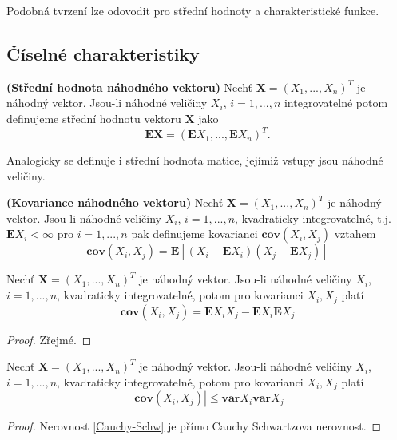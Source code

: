 \begin{remark}
Podobná tvrzení lze odovodit pro střední hodnoty a charakteristické funkce.
\end{remark}

\subsection{Číselné charakteristiky}
\begin{definition}{\textbf{(Střední hodnota náhodného vektoru)}}
Nechť $\textbf{X} = (X_{1}, ..., X_{n})^{T}$ je náhodný vektor. Jsou-li náhodné veličiny $X_{i}$, $i = 1, ..., n$ integrovatelné potom definujeme střední hodnotu vektoru $\textbf{X}$ jako
\begin{equation}
\mathbf{E}\textbf{X} = (\mathbf{E}X_{1}, ..., \mathbf{E}X_{n})^{T}.
\end{equation}
\end{definition}

Analogicky se definuje i střední hodnota matice, jejímiž vstupy jsou náhodné veličiny.

\begin{definition}{\textbf{(Kovariance náhodného vektoru)}}
Nechť $\textbf{X} = (X_{1}, ..., X_{n})^{T}$ je náhodný vektor. Jsou-li náhodné veličiny $X_{i}$, $i = 1, ..., n$, kvadraticky integrovatelné, t.j. $\mathbf{E}X_{i} < \infty$ pro $i = 1, ..., n$ pak definujeme kovarianci $\mathbf{cov}(X_{i}, X_{j})$ vztahem
\begin{equation}
\mathbf{cov}(X_{i}, X_{j}) = \mathbf{E}[(X_{i} - \mathbf{E}X_{i})(X_{j} - \mathbf{E}X_{j})] 
\end{equation}
\end{definition}

\begin{proposition}
Nechť $\textbf{X} = (X_{1}, ..., X_{n})^{T}$ je náhodný vektor. Jsou-li náhodné veličiny $X_{i}$, $i = 1, ..., n$, kvadraticky integrovatelné, potom pro kovarianci $X_{i}, X_{j}$ platí
\begin{equation}
\mathbf{cov}(X_{i}, X_{j}) = \mathbf{E}X_{i}X_{j} - \mathbf{E}X_{i}\mathbf{E}X_{j}
\end{equation}
\end{proposition}
\begin{proof}
Zřejmé.
\end{proof}

\begin{proposition}\label{Cauchy-SchwProp}
Nechť $\textbf{X} = (X_{1}, ..., X_{n})^{T}$ je náhodný vektor. Jsou-li náhodné veličiny $X_{i}$, $i = 1, ..., n$, kvadraticky integrovatelné, potom pro kovarianci $X_{i}, X_{j}$ platí
\begin{equation}\label{Cauchy-Schw}
|\mathbf{cov}(X_{i}, X_{j})| \leq \mathbf{var}X_{i} \mathbf{var}X_{j}
\end{equation}
\end{proposition}
\begin{proof}
Nerovnost \eqref{Cauchy-Schw} je přímo Cauchy Schwartzova nerovnost.
\end{proof}


